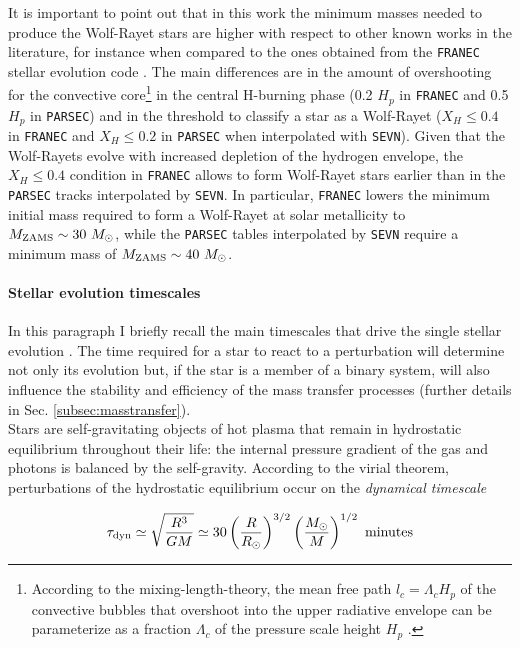 \documentclass[a4paper,titlepage]{book}     	%
\newcommand{\sun}{\ensuremath{_\odot}}
\newcommand{\mzams}{M_\textup{ZAMS}}
\newcommand{\msun}{\ensuremath{M\sun}}
\begin{document}
It is important to point out that in this work the minimum masses needed to produce the Wolf-Rayet stars are higher with respect to other known works in the literature, for instance when compared to the ones obtained from the \texttt{FRANEC} stellar evolution code \cite{Limongi2010_preSNevo}. The main differences are in the amount of overshooting for the convective core\footnote{According to the mixing-length-theory, the mean free path $l_c = \Lambda_c H_p$ of the convective bubbles that overshoot into the upper radiative envelope can be parameterize as a fraction $\Lambda_c$ of the pressure scale height $H_p$ \cite{parsec2015_chen}.} in the central H-burning phase (0.2 $H_p$ in \texttt{FRANEC} and 0.5 $H_p$ in \texttt{PARSEC}) and in the threshold to classify a star as a Wolf-Rayet ($X_H \leq 0.4$ in \texttt{FRANEC} and $X_H \leq 0.2$ in \texttt{PARSEC} when interpolated with \texttt{SEVN}). Given that the Wolf-Rayets evolve with increased depletion of the hydrogen envelope, the $X_H \leq 0.4$ condition in \texttt{FRANEC} allows to form Wolf-Rayet stars earlier than in the \texttt{PARSEC} tracks interpolated by \texttt{SEVN}. In particular, \texttt{FRANEC} lowers the minimum initial mass required to form a Wolf-Rayet at solar metallicity to $\mzams \sim 30~\msun$, while the \texttt{PARSEC} tables interpolated by \texttt{SEVN} require a minimum mass of $\mzams \sim 40~\msun$. 


\paragraph{Stellar evolution timescales} In this paragraph I briefly recall the main timescales that drive the single stellar evolution \cite{evostellare}. The time required for a star to react to a perturbation will determine not only its evolution but, if the star is a member of a binary system, will also influence the stability and efficiency of the mass transfer processes (further details in Sec. \ref{subsec:masstransfer}). \\

Stars are self-gravitating objects of hot plasma that remain in hydrostatic equilibrium throughout their life: the internal pressure gradient of the gas and photons is balanced by the self-gravity. According to the virial theorem, perturbations of the hydrostatic equilibrium occur on the \emph{dynamical timescale}

\begin{equation}\label{eq:taudyn}
\tau_\textup{dyn} \simeq \sqrt{\frac{R^3}{G M}} \simeq 30 \left(\frac{R}{R\sun}\right)^{3/2} \left(\frac{M\sun}{M}\right)^{1/2}\ \text{minutes}
\end{equation}
\end{document}
